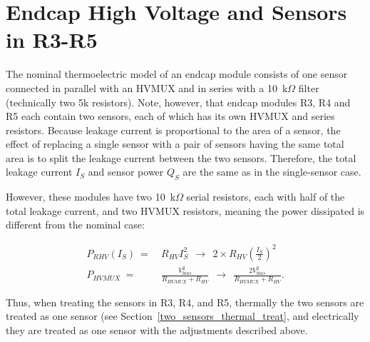 
\section{Endcap High Voltage and Sensors in R3-R5}
\label{highvoltage}

The nominal thermoelectric model of an endcap module consists of one sensor connected in parallel with
an HVMUX and in series with a 10~k$\Omega$ filter (technically two 5k resistors).
Note, however, that endcap modules R3, R4 and R5 each contain two sensors, each of which has its own
HVMUX and series resistors. Because leakage current is proportional to the area of a sensor,
the effect of replacing a single sensor with a pair of sensors having the same total area is to split
the leakage current between the two sensors. Therefore, the total leakage current $I_S$ and sensor
power $Q_S$ are the same as in the single-sensor case.

However, these modules have two 10~k$\Omega$ serial resistors, each with half of the total
leakage current, and two HVMUX resistors, meaning the power dissipated is different from the nominal
case:

\begin{align}
P_{RHV}(I_S) ~=~& R_{HV}I_S^2~~\rightarrow~~ 2\times R_{HV}\left(\frac{I_S}{2}\right)^2 \\
P_{HVMUX} ~=~& \frac{ V^2_{bias} }{R_{HVMUX} + R_{HV}} ~~\rightarrow~~ 
             \frac{2V^2_{bias} }{R_{HVMUX} + R_{HV}}.
\end{align}

Thus, when treating the sensors in R3, R4, and R5, thermally the two sensors are treated as one sensor
(see Section~\ref{two_sensors_thermal_treat}, and electrically they are treated as one sensor with the
adjustments described above.
